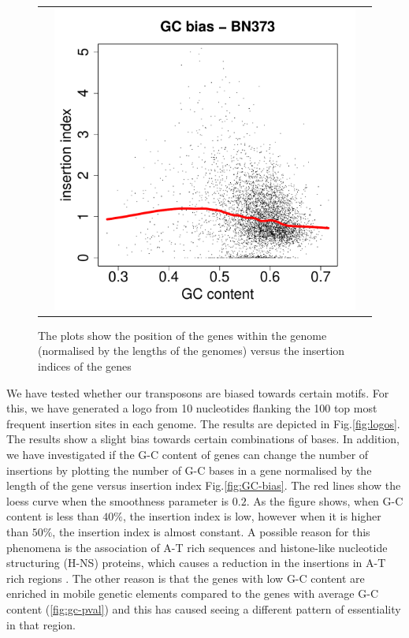 \documentclass[12pt,letterpaper]{article}
\begin{document}
\begin{figure}
\begin{tabular}{c c c}
&\includegraphics[page=38, scale=0.25]{biases.pdf}&\\
\end{tabular}
\caption{The plots show the position of the genes within the genome (normalised by the lengths of the genomes) versus the insertion indices of the genes}
\label{fig:distance-bias}
\end{figure}

We have tested whether our transposons are biased towards certain motifs. For this, we have generated a logo from 10 nucleotides flanking the 100 top most frequent insertion sites in each genome. The results are depicted in Fig.\@  \ref{fig:logos}. The results show a slight bias towards certain combinations of bases. In addition, we have investigated if the G-C content of genes can change the number of insertions by plotting the number of G-C bases in a gene normalised by the length of the gene versus insertion index Fig.\@  \ref{fig:GC-bias}. The red lines show the loess curve when the smoothness parameter is $0.2$. As the figure shows, when G-C content is less than $40\%$, the insertion index is low, however when it is higher than $50\%$, the insertion index is almost constant. A possible reason for this phenomena is the association of A-T rich sequences and histone-like nucleotide structuring (H-NS) proteins, which causes a reduction in the insertions in A-T rich regions \cite{kimura_nucleoid_2016}. The other reason is that the genes with low G-C content are enriched in mobile genetic elements compared to the genes with average G-C content (\ref{fig:gc-pval}) and this has caused seeing a different pattern of essentiality in that region.
\end{document}

